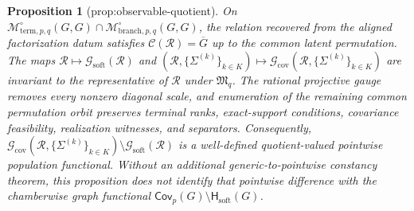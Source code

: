 \documentclass{article}
\newtheorem{proposition}{Proposition}
\begin{document}
\begin{proposition}[prop:observable-quotient]\label{prop:observable-quotient}
On \(\mathcal M^{\circ}_{\mathrm{term},p,q}(G,G)\cap\mathcal M^{\circ}_{\mathrm{branch},p,q}(G,G)\), the relation recovered from the aligned factorization datum satisfies \(\mathcal C(\mathcal R)=\overline G\) up to the common latent permutation.  The maps \(\mathcal R\mapsto\mathcal G_{\mathrm{soft}}(\mathcal R)\) and \((\mathcal R,\{\Sigma^{(k)}\}_{k\in K})\mapsto\mathcal G_{\mathrm{cov}}(\mathcal R,\{\Sigma^{(k)}\}_{k\in K})\) are invariant to the representative of \(\mathcal R\) under \(\mathfrak M_q\).  The rational projective gauge removes every nonzero diagonal scale, and enumeration of the remaining common permutation orbit preserves terminal ranks, exact-support conditions, covariance feasibility, realization witnesses, and separators.  Consequently, \(\mathcal G_{\mathrm{cov}}(\mathcal R,\{\Sigma^{(k)}\}_{k\in K})\setminus\mathcal G_{\mathrm{soft}}(\mathcal R)\) is a well-defined quotient-valued pointwise population functional.  Without an additional generic-to-pointwise constancy theorem, this proposition does not identify that pointwise difference with the chamberwise graph functional \(\mathsf{Cov}_p(G)\setminus\mathsf H_{\mathrm{soft}}(G)\).
\end{proposition}
\end{document}
